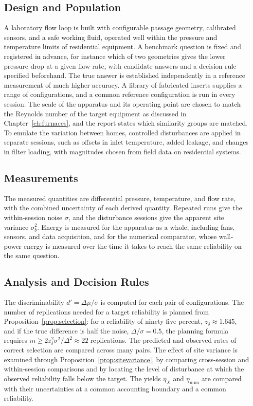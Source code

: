 \subsection*{Design and Population}

A laboratory flow loop is built with configurable passage geometry, calibrated sensors, and a safe working fluid, operated well within the pressure and temperature limits of residential equipment. A benchmark question is fixed and registered in advance, for instance which of two geometries gives the lower pressure drop at a given flow rate, with candidate answers and a decision rule specified beforehand. The true answer is established independently in a reference measurement of much higher accuracy. A library of fabricated inserts supplies a range of configurations, and a common reference configuration is run in every session. The scale of the apparatus and its operating point are chosen to match the Reynolds number of the target equipment as discussed in Chapter~\ref{ch:furnaces}, and the report states which similarity groups are matched. To emulate the variation between homes, controlled disturbances are applied in separate sessions, such as offsets in inlet temperature, added leakage, and changes in filter loading, with magnitudes chosen from field data on residential systems.

\subsection*{Measurements}

The measured quantities are differential pressure, temperature, and flow rate, with the combined uncertainty of each derived quantity. Repeated runs give the within-session noise $\sigma$, and the disturbance sessions give the apparent site variance $\sigma_b^{2}$. Energy is measured for the apparatus as a whole, including fans, sensors, and data acquisition, and for the numerical comparator, whose wall-power energy is measured over the time it takes to reach the same reliability on the same question.

\subsection*{Analysis and Decision Rules}

The discriminability $d'=\Delta\mu/\sigma$ is computed for each pair of configurations. The number of replications needed for a target reliability is planned from Proposition~\ref{prop:selection}: for a reliability of ninety-five percent, $z_\delta\approx1.645$, and if the true difference is half the noise, $\Delta/\sigma=0.5$, the planning formula requires $m\ge 2z_\delta^{2}\sigma^{2}/\Delta^{2}\approx22$ replications. The predicted and observed rates of correct selection are compared across many pairs. The effect of site variance is examined through Proposition~\ref{prop:sitevariance}, by comparing cross-session and within-session comparisons and by locating the level of disturbance at which the observed reliability falls below the target. The yields $\eta_X$ and $\eta_{\mathrm{num}}$ are compared with their uncertainties at a common accounting boundary and a common reliability.

